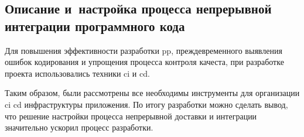 \subsection{Описание и~настройка процесса непрерывной интеграции программного кода}
\label{sec:testing:ci}

Для повышения эффективности разработки \gls{pp}, преждевременного выявления ошибок кодирования и упрощения процесса контроля качеста, при разработке проекта использовались техники \gls{ci} и \gls{cd}.







Таким образом, были рассмотрены все необходимы инструменты для организации \gls{ci} \gls{cd} инфраструктуры приложения. По итогу разработки можно сделать вывод, что решение настройки процесса непрерывной доставки и интеграции значительно ускорил процесс разработки.